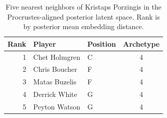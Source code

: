 \begin{table}[htbp]
  \centering\small
  \begin{tabular}{rllc}
    \toprule
    Rank & Player & Position & Archetype \\
    \midrule
    1 & Chet Holmgren & C & 4 \\
    2 & Chris Boucher & F & 4 \\
    3 & Matas Buzelis & F & 4 \\
    4 & Derrick White & G & 4 \\
    5 & Peyton Watson & G & 4 \\
    \bottomrule
  \end{tabular}
  \caption{Five nearest neighbors of Kristaps Porzingis in the Procrustes-aligned posterior latent space. Rank is by posterior mean embedding distance.}
  \label{tab:Kristaps_Porzingis_neighbors}
\end{table}

